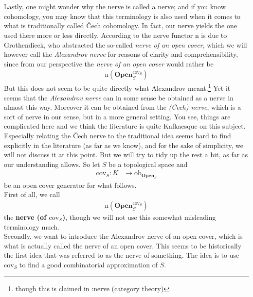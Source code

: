 \\\\
Lastly, one might wonder why the nerve is called a nerve; and if you know cohomology, you may know that this terminology is also used when it comes to what is traditionally called \v{C}ech cohomology.
In fact, our nerve yields the one used there more or less directly.
According to \cite{wiki-nlab0000} the nerve functor $\mathrm{n}$ is due to Grothendieck, who abstracted the so-called \textit{nerve of an open cover}, which we will however call the \textit{Alexandrov nerve} for reasons of clarity and comprehensibility, since from our perspective the \textit{nerve of an open cover} would rather be
\begin{align*}
  \mathrm{n}
  \left(
    \mathbf{Open}_{S}^{\mathrm{cov}_{S}}
  \right)
\end{align*}
But this does not seem to be quite directly what Alexandrov meant.\footnote{though this is claimed in \cite{wiki-pedia0en}:nerve (category theory)} Yet it seems that the \textit{Alexandrov nerve} can in some sense be obtained as a nerve in almost this way.
Moreover it can be obtained from the \textit{(\v{C}ech) nerve}, which is a sort of nerve in our sense, but in a more general setting.
You see, things are complicated here and we think the literature is quite Kafkaesque on this subject.
Especially relating the \v{C}ech nerve to the traditional idea seems hard to find explicitly in the literature (as far as we know), and for the sake of simplicity, we will not discuss it at this point.
But we will try to tidy up the rest a bit, as far as our understanding allows.
So let $S$ be a topological space and
\begin{align*}
  \mathrm{cov}_{S}
  \colon
  K
  &\rightarrow
  \mathrm{ob}_{\mathbf{Open}_{S}}
\end{align*}
be an open cover generator for what follows.
\\
First of all, we call
\begin{align*}
  \mathrm{n}
  \left(
    \mathbf{Open}_{S}^{\mathrm{cov}_{S}}
  \right)
\end{align*}
the \textbf{nerve (of $\mathrm{cov}_{S}$)}, though we will not use this somewhat misleading terminology much.
\\
Secondly, we want to introduce the Alexandrov nerve of an open cover, which is what is actually called the nerve of an open cover.
This seems to be historically the first idea that was referred to as the nerve of something.
The idea is to use $\mathrm{cov}_{S}$ to find a good combinatorial approximation of $S$.

